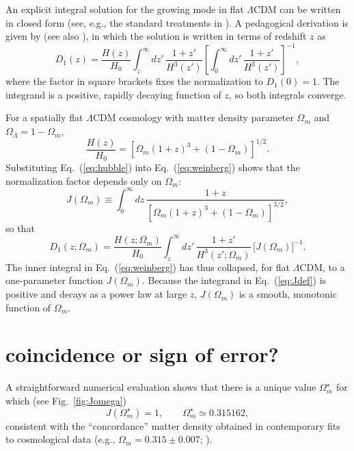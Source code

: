 \documentclass[twocolumn]{aastex701}
\begin{document}
An explicit integral solution for the growing mode in flat $\Lambda$CDM can be written in closed form (see, e.g., the standard treatments in \cite{Peebles1980,Heath1977}). A pedagogical derivation is given by \cite{WeinbergNotes} (see also \cite{Eisenstein1997}), in which the solution is written in terms of redshift $z$ as
\begin{equation}
D_1(z) = \frac{H(z)}{H_0}
\int_z^{\infty} dz'\,\frac{1+z'}{H^3(z')}
\left[
\int_0^{\infty} dz'\,\frac{1+z'}{H^3(z')}
\right]^{-1},
\label{eq:weinberg}
\end{equation}
where the factor in square brackets fixes the normalization to $D_1(0)=1$. The integrand is a positive, rapidly decaying function of $z$, so both integrals converge.

For a spatially flat $\Lambda$CDM cosmology with matter density parameter $\Omega_m$ and $\Omega_\Lambda=1-\Omega_m$,
\begin{equation}
\frac{H(z)}{H_0} = \left[\Omega_m (1+z)^3 + (1-\Omega_m)\right]^{1/2}.
\label{eq:hubble}
\end{equation}
Substituting Eq.~(\ref{eq:hubble}) into Eq.~(\ref{eq:weinberg}) shows that the normalization factor depends only on $\Omega_m$:
\begin{equation}
J(\Omega_m) \equiv \int_0^{\infty} dz\,
\frac{1+z}{\left[\Omega_m (1+z)^3 + (1-\Omega_m)\right]^{3/2}},
\label{eq:Jdef}
\end{equation}
so that
\begin{equation}
D_1(z;\Omega_m) =
\frac{H(z;\Omega_m)}{H_0}
\int_z^{\infty} dz'\,\frac{1+z'}{H^3(z';\Omega_m)}\,
\big[J(\Omega_m)\big]^{-1}.
\label{eq:Dfull}
\end{equation}
The inner integral in Eq.~(\ref{eq:weinberg}) has thus collapsed, for flat $\Lambda$CDM, to a one-parameter function $J(\Omega_m)$. Because the integrand in Eq.~(\ref{eq:Jdef}) is positive and decays as a power law at large $z$, $J(\Omega_m)$ is a smooth, monotonic function of $\Omega_m$. 

\section{coincidence or sign of error?}

A straightforward numerical evaluation shows that there is a unique value $\Omega_m^\star$ for which (see Fig.~\ref{fig:Jomega})
\begin{equation}
J(\Omega_m^\star) = 1,
\qquad
\Omega_m^\star \simeq 0.315162,
\label{eq:omegastar}
\end{equation}
consistent with the ``concordance'' matter density obtained in contemporary fits to cosmological data (e.g., $\Omega_m = 0.315 \pm 0.007$; \citealt{Aghanim2020}).
\end{document}
